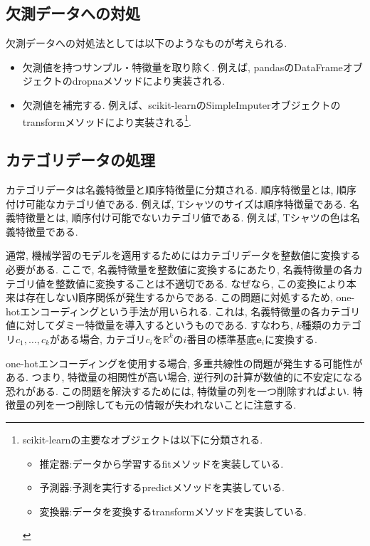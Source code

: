 \documentclass[uplatex]{jsarticle}
\theoremstyle{definition}
\numberwithin{equation}{section}
\newcommand{\R}{\mathbb{R}}
\begin{document}
\subsection{欠測データへの対処}
欠測データへの対処法としては以下のようなものが考えられる.
\begin{itemize}
    \item
    欠測値を持つサンプル・特徴量を取り除く.
    例えば, pandasのDataFrameオブジェクトのdropnaメソッドにより実装される.
    \item
    欠測値を補完する.
    例えば、scikit-learnのSimpleImputerオブジェクトのtransformメソッドにより実装される\footnote{
        scikit-learnの主要なオブジェクトは以下に分類される.
        \begin{itemize}
            \item
            推定器:データから学習するfitメソッドを実装している.
            \item
            予測器:予測を実行するpredictメソッドを実装している.
            \item
            変換器:データを変換するtransformメソッドを実装している.
        \end{itemize}
    }.
\end{itemize}

\subsection{カテゴリデータの処理}
カテゴリデータは名義特徴量と順序特徴量に分類される.
順序特徴量とは, 順序付け可能なカテゴリ値である.
例えば, Tシャツのサイズは順序特徴量である.
名義特徴量とは, 順序付け可能でないカテゴリ値である.
例えば, Tシャツの色は名義特徴量である.

通常, 機械学習のモデルを適用するためにはカテゴリデータを整数値に変換する必要がある.
ここで, 名義特徴量を整数値に変換するにあたり, 名義特徴量の各カテゴリ値を整数値に変換することは不適切である.
なぜなら, この変換により本来は存在しない順序関係が発生するからである.
この問題に対処するため, one-hotエンコーディングという手法が用いられる.
これは, 名義特徴量の各カテゴリ値に対してダミー特徴量を導入するというものである.
すなわち, $k$種類のカテゴリ$c_{1}, \dots, c_{k}$がある場合, カテゴリ$c_{i}$を$\R^{k}$の$i$番目の標準基底$\bm{e}_{i}$に変換する.

one-hotエンコーディングを使用する場合, 多重共線性の問題が発生する可能性がある.
つまり, 特徴量の相関性が高い場合, 逆行列の計算が数値的に不安定になる恐れがある.
この問題を解決するためには, 特徴量の列を一つ削除すればよい.
特徴量の列を一つ削除しても元の情報が失われないことに注意する.
\end{document}

